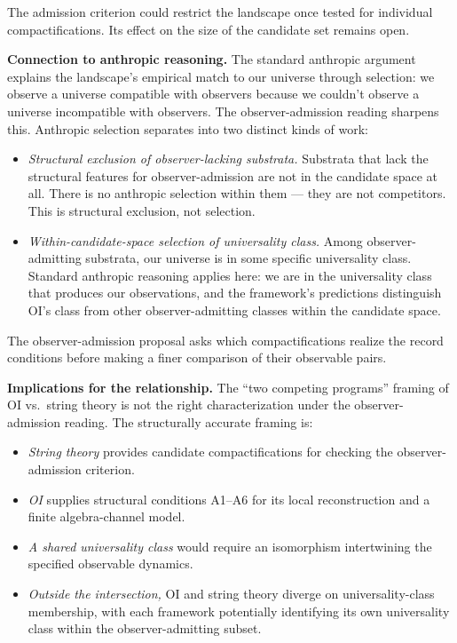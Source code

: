 \documentclass[
]{article}
\providecommand{\tightlist}{%
  \setlength{\itemsep}{0pt}\setlength{\parskip}{0pt}}
\begin{document}
The admission criterion could restrict the landscape once tested for
individual compactifications. Its effect on the size of the candidate
set remains open.

\textbf{Connection to anthropic reasoning.} The standard anthropic
argument explains the landscape's empirical match to our universe
through selection: we observe a universe compatible with observers
because we couldn't observe a universe incompatible with observers. The
observer-admission reading sharpens this. Anthropic selection separates
into two distinct kinds of work:

\begin{itemize}
\item
  \emph{Structural exclusion of observer-lacking substrata.} Substrata
  that lack the structural features for observer-admission are not in
  the candidate space at all. There is no anthropic selection within
  them --- they are not competitors. This is structural exclusion, not
  selection.
\item
  \emph{Within-candidate-space selection of universality class.} Among
  observer-admitting substrata, our universe is in some specific
  universality class. Standard anthropic reasoning applies here: we are
  in the universality class that produces our observations, and the
  framework's predictions distinguish OI's class from other
  observer-admitting classes within the candidate space.
\end{itemize}

The observer-admission proposal asks which compactifications realize the
record conditions before making a finer comparison of their observable
pairs.

\textbf{Implications for the relationship.} The ``two competing
programs'' framing of OI vs.~string theory is not the right
characterization under the observer-admission reading. The structurally
accurate framing is:

\begin{itemize}
\tightlist
\item
  \emph{String theory} provides candidate compactifications for checking
  the observer-admission criterion.
\item
  \emph{OI} supplies structural conditions A1--A6 for its local
  reconstruction and a finite algebra-channel model.
\item
  \emph{A shared universality class} would require an isomorphism
  intertwining the specified observable dynamics.
\item
  \emph{Outside the intersection,} OI and string theory diverge on
  universality-class membership, with each framework potentially
  identifying its own universality class within the observer-admitting
  subset.
\end{itemize}
\end{document}
